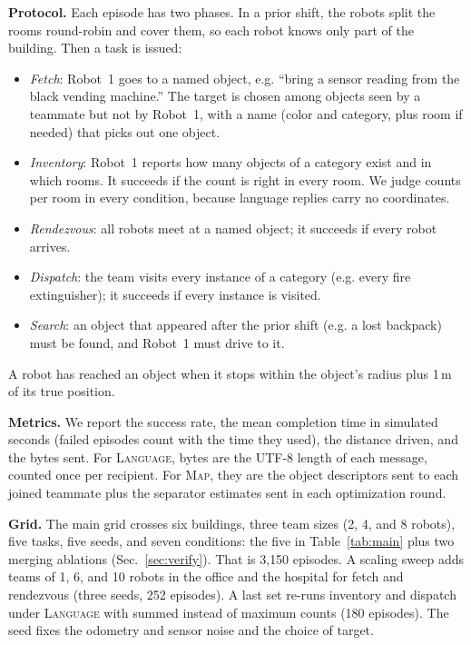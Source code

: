 \documentclass[conference]{IEEEtran}
\newcommand{\cond}[1]{\textsc{#1}}
\begin{document}
\textbf{Protocol.}
Each episode has two phases.
In a prior shift, the robots split the rooms round-robin and cover them, so each robot knows only part of the building.
Then a task is issued:
\begin{itemize}
\item \emph{Fetch}: Robot~1 goes to a named object, e.g. ``bring a sensor reading from the black vending machine.'' The target is chosen among objects seen by a teammate but not by Robot~1, with a name (color and category, plus room if needed) that picks out one object.
\item \emph{Inventory}: Robot~1 reports how many objects of a category exist and in which rooms. It succeeds if the count is right in every room. We judge counts per room in every condition, because language replies carry no coordinates.
\item \emph{Rendezvous}: all robots meet at a named object; it succeeds if every robot arrives.
\item \emph{Dispatch}: the team visits every instance of a category (e.g. every fire extinguisher); it succeeds if every instance is visited.
\item \emph{Search}: an object that appeared after the prior shift (e.g. a lost backpack) must be found, and Robot~1 must drive to it.
\end{itemize}
A robot has reached an object when it stops within the object's radius plus 1\,m of its true position.

\textbf{Metrics.}
We report the success rate, the mean completion time in simulated seconds (failed episodes count with the time they used), the distance driven, and the bytes sent.
For \cond{Language}, bytes are the UTF-8 length of each message, counted once per recipient.
For \cond{Map}, they are the object descriptors sent to each joined teammate plus the separator estimates sent in each optimization round.

\textbf{Grid.}
The main grid crosses six buildings, three team sizes (2, 4, and 8 robots), five tasks, five seeds, and seven conditions: the five in Table~\ref{tab:main} plus two merging ablations (Sec.~\ref{sec:verify}). That is 3{,}150 episodes.
A scaling sweep adds teams of 1, 6, and 10 robots in the office and the hospital for fetch and rendezvous (three seeds, 252 episodes).
A last set re-runs inventory and dispatch under \cond{Language} with summed instead of maximum counts (180 episodes).
The seed fixes the odometry and sensor noise and the choice of target.

\end{document}
